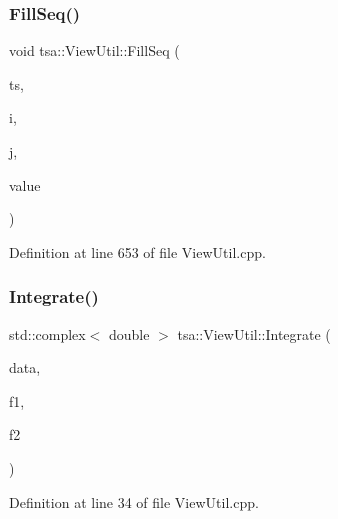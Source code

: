 \subsubsection{\texorpdfstring{Fill\+Seq()}{FillSeq()}}
{\footnotesize\ttfamily void tsa\+::\+View\+Util\+::\+Fill\+Seq (\begin{DoxyParamCaption}\item[{\hyperlink{namespacetsa_ac599574bcc094eda25613724b8f3ca9e}{Seq\+View\+Double} \&}]{ts,  }\item[{unsigned int}]{i,  }\item[{unsigned int}]{j,  }\item[{double}]{value }\end{DoxyParamCaption})\hspace{0.3cm}{\ttfamily [static]}}



Definition at line 653 of file View\+Util.\+cpp.

\mbox{\label{classtsa_1_1_view_util_a6ce61da5cef5306cc1cbbf715c39871c}} 
\subsubsection{\texorpdfstring{Integrate()}{Integrate()}\hspace{0.1cm}{\footnotesize\ttfamily [1/2]}}
{\footnotesize\ttfamily std\+::complex$<$ double $>$ tsa\+::\+View\+Util\+::\+Integrate (\begin{DoxyParamCaption}\item[{\hyperlink{namespacetsa_ab32775c889b53c40fa83939f22372b75}{Seq\+View\+Complex} \&}]{data,  }\item[{double}]{f1,  }\item[{double}]{f2 }\end{DoxyParamCaption})\hspace{0.3cm}{\ttfamily [static]}}



Definition at line 34 of file View\+Util.\+cpp.

\mbox{\label{classtsa_1_1_view_util_af4179aaa62db551eebda4a49e0232c12}} 

